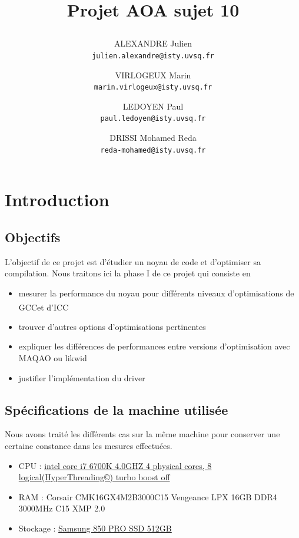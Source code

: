 \documentclass{report}
\begin{document}
\title{
  \begin{minipage}\linewidth
      \centering
      Projet AOA sujet 10 \textcopyleft
      \vskip 5pt
      \author{
        ALEXANDRE Julien \\
        \texttt{julien.alexandre@isty.uvsq.fr}
      \and
        VIRLOGEUX Marin \\
        \texttt{marin.virlogeux@isty.uvsq.fr}
      \and
        LEDOYEN Paul \\
        \texttt{paul.ledoyen@isty.uvsq.fr}
      \and
        DRISSI Mohamed Reda \\
        \texttt{reda-mohamed@isty.uvsq.fr}
      }
    \end{minipage}
}
\maketitle
\newpage
\tableofcontents
\newpage
\section{Introduction}
 \subsection{Objectifs}
  	L'objectif de ce projet est d'étudier un noyau de code et d'optimiser sa compilation. Nous traitons ici la phase I de ce projet qui consiste en
  	\begin{itemize}
  	\item mesurer la performance du noyau pour différents niveaux d'optimisations de GCC\textsuperscript \textcopyleft   et d'ICC
  	\item trouver d'autres options d'optimisations pertinentes
	\item expliquer les différences de performances entre versions d'optimisation avec MAQAO ou likwid
	\item justifier l'implémentation du driver
  	\end{itemize}
  \subsection{Spécifications de la machine utilisée}
  Nous avons traité les différents cas sur la même machine pour conserver une certaine constance dans les mesures effectuées.
    \begin{itemize}
      \item CPU : \href{https://ark.intel.com/products/88195/Intel-Core-i7-6700K-Processor-8M-Cache-up-to-4_20-GHz}
        {intel core i7 6700K 4.0GHZ 4 physical cores, 8 logical(HyperThreading©) turbo boost off}
      \item RAM : Corsair CMK16GX4M2B3000C15 Vengeance LPX 16GB DDR4 3000MHz C15 XMP 2.0
      \item Stockage : \href{http://downloadcenter.samsung.com/content/UM/201711/20171115103115156/Samsung_SSD_850_PRO_Data_Sheet_Rev_3.pdf}
          {Samsung 850 PRO SSD 512GB}
    \end{itemize}
\end{document}

